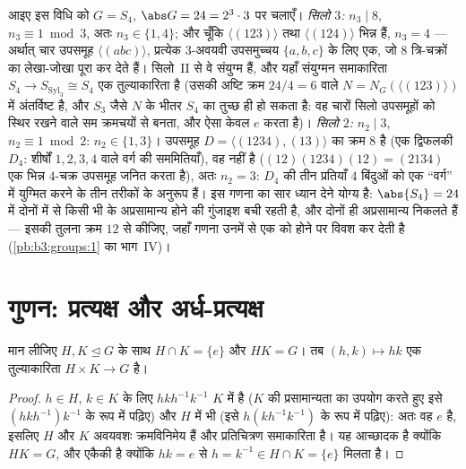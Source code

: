 \begin{example}[एक पूर्ण सिलो गणना: $S_4$]
\label{ex:b3:groups:s4sylow}
आइए इस विधि को $G = S_4$, $\abs G = 24 = 2^3\cdot3$ पर चलाएँ।
\emph{सिलो $3$:} $n_3 \mid 8$, $n_3 \equiv 1 \bmod 3$, अतः $n_3
\in \{1, 4\}$; और चूँकि $\langle(123)\rangle$ तथा
$\langle(124)\rangle$ भिन्न हैं, $n_3 = 4$ --- अर्थात् चार उपसमूह $\langle(abc)\rangle$, प्रत्येक
$3$-अवयवी उपसमुच्चय $\{a, b, c\}$ के लिए एक, जो $8$ त्रि-चक्रों का
लेखा-जोखा पूरा कर देते हैं। सिलो~II से वे संयुग्म हैं, और यहाँ
संयुग्मन समाकारिता $S_4 \to
S_{\mathrm{Syl}_3} \cong S_4$ एक तुल्याकारिता है (उसकी अष्टि क्रम
$24/4 =
6$ वाले $N = N_G(\langle(123)\rangle)$ में अंतर्विष्ट है, और $S_3$ जैसे $N$ के भीतर
$S_4$ का  तुच्छ ही हो सकता है: वह चारों सिलो
उपसमूहों को स्थिर रखने वाले सम क्रमचयों से बनता, और ऐसा केवल
$e$ करता है)। \emph{सिलो $2$:} $n_2 \mid 3$, $n_2
\equiv 1 \bmod 2$: $n_2 \in \{1, 3\}$। उपसमूह
$D =
\langle(1234), (13)\rangle$ का क्रम $8$ है (एक द्विफलकी $D_4$: शीर्षों $1, 2, 3, 4$ वाले
वर्ग की सममितियाँ), वह  नहीं है ($(12)(1234)(12) = (2134)$ एक भिन्न
$4$-चक्र उपसमूह जनित करता है), अतः $n_2 = 3$: $D_4$ की तीन
प्रतियाँ $4$ बिंदुओं को एक ``वर्ग'' में युग्मित करने के तीन
तरीकों के अनुरूप हैं। इस गणना का सार ध्यान देने योग्य है: $\abs{S_4} = 24$
में दोनों में से किसी भी  के अप्रसामान्य होने की
गुंजाइश बची रहती है, और दोनों ही अप्रसामान्य निकलते हैं ---
इसकी तुलना क्रम $12$ से कीजिए, जहाँ गणना उनमें से एक को
 होने पर विवश कर देती है (\cref{pb:b3:groups:1} का भाग~IV)।
\end{example}

\section{गुणन: प्रत्यक्ष और अर्ध-प्रत्यक्ष}

\begin{proposition}[प्रत्यक्ष गुणन की पहचान]\label{prop:b3:groups:direct}
मान लीजिए $H, K \trianglelefteq G$ के साथ $H \cap K = \{e\}$ और $HK = G$। तब $(h,k) \mapsto hk$ एक तुल्याकारिता
$H \times K \to
G$ है।
\end{proposition}

\begin{proof}
$h \in H$, $k \in K$ के लिए  $hkh^{-1}k^{-1}$ $K$ में है ($K$ की
प्रसामान्यता का उपयोग करते हुए इसे $(hkh^{-1})k^{-1}$ के रूप में पढ़िए) और
$H$ में भी (इसे $h(kh^{-1}k^{-1})$ के रूप में पढ़िए): अतः वह $e$ है,
इसलिए $H$ और $K$ अवयवशः क्रमविनिमेय हैं और प्रतिचित्रण
समाकारिता है। यह आच्छादक है क्योंकि $HK = G$, और एकैकी है क्योंकि
$hk = e$ से $h = k^{-1} \in
H \cap K = \{e\}$ मिलता है।
\end{proof}

